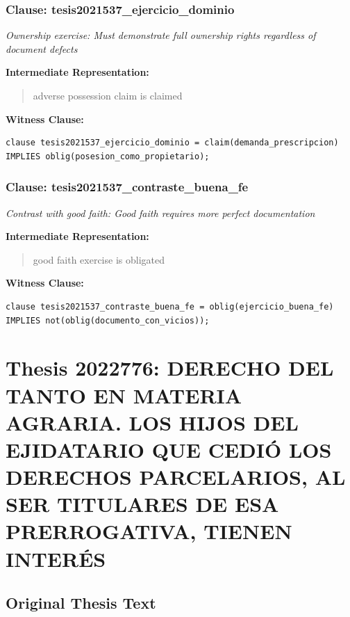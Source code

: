 \documentclass[11pt,a4paper]{article}
\begin{document}
\subsubsection{Clause: tesis2021537\_ejercicio\_dominio}

\textit{Ownership exercise: Must demonstrate full ownership rights regardless of document defects}

\textbf{Intermediate Representation:}

\begin{quote}
adverse possession claim is claimed
\end{quote}

\textbf{Witness Clause:}

\begin{lstlisting}[style=witnessstyle, language=Witness]
clause tesis2021537_ejercicio_dominio = claim(demanda_prescripcion) IMPLIES oblig(posesion_como_propietario);
\end{lstlisting}

\subsubsection{Clause: tesis2021537\_contraste\_buena\_fe}

\textit{Contrast with good faith: Good faith requires more perfect documentation}

\textbf{Intermediate Representation:}

\begin{quote}
good faith exercise is obligated
\end{quote}

\textbf{Witness Clause:}

\begin{lstlisting}[style=witnessstyle, language=Witness]
clause tesis2021537_contraste_buena_fe = oblig(ejercicio_buena_fe) IMPLIES not(oblig(documento_con_vicios));
\end{lstlisting}

\newpage

\section{Thesis 2022776: DERECHO DEL TANTO EN MATERIA AGRARIA. LOS HIJOS DEL EJIDATARIO QUE CEDIÓ LOS DERECHOS PARCELARIOS, AL SER TITULARES DE ESA PRERROGATIVA, TIENEN INTERÉS}
\label{thesis:2022776}

\subsection{Original Thesis Text}
\end{document}
